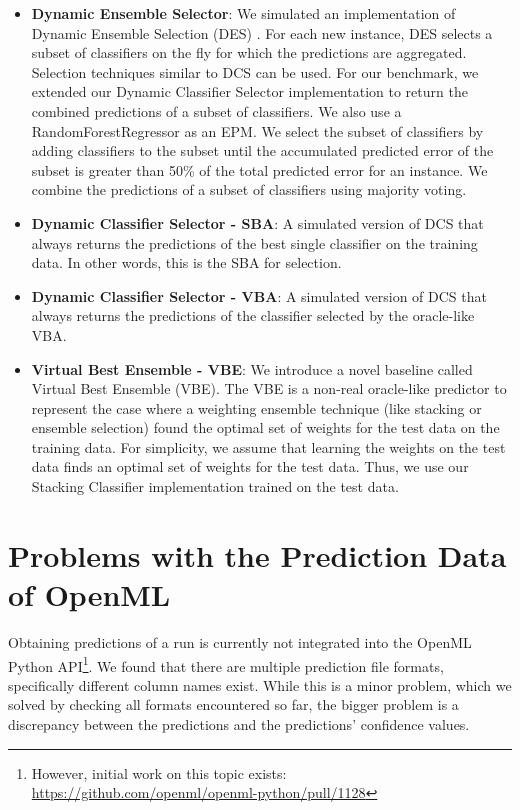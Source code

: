 \documentclass[11pt]{article}
\begin{document}
\begin{itemize}
\item \textbf{Dynamic Ensemble Selector}: We simulated an implementation of Dynamic Ensemble Selection (DES) \citep{ko2008dynamic}. For each new instance, DES selects a subset of classifiers on the fly for which the predictions are aggregated. Selection techniques similar to DCS can be used. For our benchmark, we extended our Dynamic Classifier Selector implementation to return the combined predictions of a subset of classifiers. We also use a RandomForestRegressor as an EPM. We select the subset of classifiers by adding classifiers to the subset until the accumulated predicted error of the subset is greater than 50\% of the total predicted error for an instance. We combine the predictions of a subset of classifiers using majority voting. 

\item \textbf{Dynamic Classifier Selector - SBA}: A simulated version of DCS that always returns the predictions of the best single classifier on the training data. In other words, this is the SBA for selection.

\item \textbf{Dynamic Classifier Selector - VBA}: A simulated version of DCS that always returns the predictions of the classifier selected by the oracle-like VBA. 

\item \textbf{Virtual Best Ensemble - VBE}: We introduce a novel baseline called Virtual Best Ensemble (VBE). The VBE is a non-real oracle-like predictor to represent the case where a weighting ensemble technique (like stacking or ensemble selection) found the optimal set of weights for the test data on the training data. For simplicity, we assume that learning the weights on the test data finds an optimal set of weights for the test data. Thus, we use our Stacking Classifier implementation trained on the test data.  

\end{itemize}

\section{Problems with the Prediction Data of OpenML}
\label{appdx:parseproblems}
Obtaining predictions of a run is currently not integrated into the OpenML Python API\footnote{However, initial work on this topic exists: \url{https://github.com/openml/openml-python/pull/1128}}.
We found that there are multiple prediction file formats, specifically different column names exist. 
While this is a minor problem, which we solved by checking all formats encountered so far, the bigger problem is a discrepancy between the predictions and the predictions' confidence values. 
\end{document}
